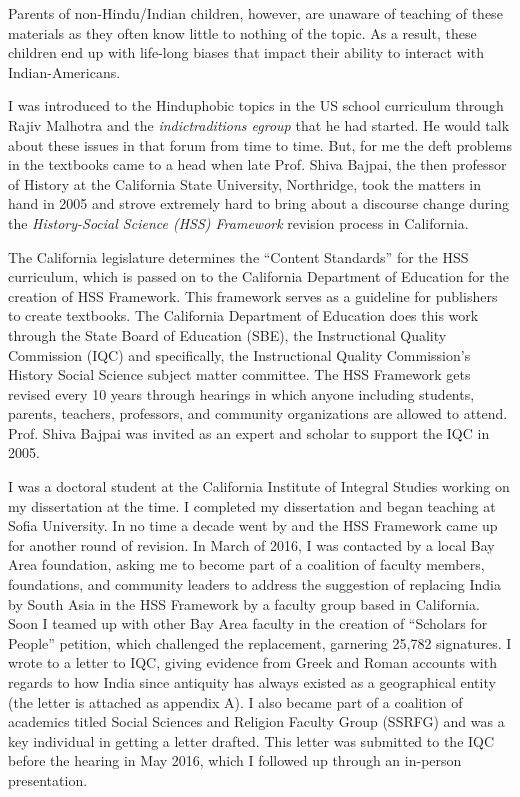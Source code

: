 Parents of non-Hindu/Indian children, however, are unaware of teaching of these materials as they often know little to nothing of the topic. As a result, these children end up with life-long biases that impact their ability to interact with Indian-Americans.

I was introduced to the Hinduphobic topics in the US school curriculum through Rajiv Malhotra and the \textit{indictraditions egroup} that he had started. He would talk about these issues in that forum from time to time. But, for me the deft problems in the textbooks came to a head when late Prof. Shiva Bajpai, the then professor of History at the California State University, Northridge, took the matters in hand in 2005 and strove extremely hard to bring about a discourse change during the \textit{History-Social Science (HSS) Framework} revision process in California. 

The California legislature determines the “Content Standards” for the HSS curriculum, which is passed on to the California Department of Education for the creation of HSS Framework. This framework serves as a guideline for publishers to create textbooks. The California Department of Education does this work through the State Board of Education (SBE), the Instructional Quality Commission (IQC) and specifically, the Instructional Quality Commission’s History Social Science subject matter committee. The HSS Framework gets revised every 10 years through hearings in which anyone including students, parents, teachers, professors, and community organizations are allowed to attend. Prof. Shiva Bajpai was invited as an expert and scholar to support the IQC in 2005. 

I was a doctoral student at the California Institute of Integral Studies working on my dissertation at the time. I completed my dissertation and began teaching at Sofia University. In no time a decade went by and the HSS Framework came up for another round of revision. In March of 2016, I was contacted by a local Bay Area foundation, asking me to become part of a coalition of faculty members, foundations, and community leaders to address the suggestion of replacing India by South Asia in the HSS Framework by a faculty group based in California. Soon I teamed up with other Bay Area faculty in the creation of “Scholars for People” petition, which challenged the replacement, garnering 25,782 signatures. I wrote to a letter to IQC, giving evidence from Greek and Roman accounts with regards to how India since antiquity has always existed as a geographical entity (the letter is attached as appendix A). I also became part of a coalition of academics titled Social Sciences and Religion Faculty Group (SSRFG) and was a key individual in getting a letter drafted. This letter was submitted to the IQC before the hearing in May 2016, which I followed up through an in-person presentation. 


